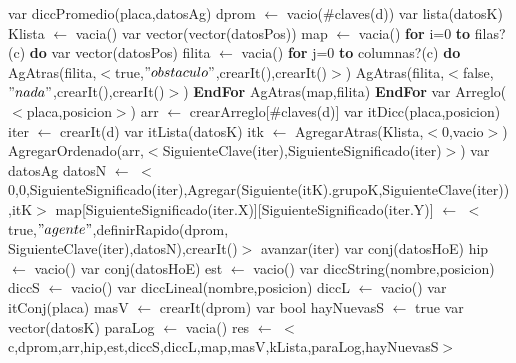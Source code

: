 \begin{algorithm}[H]
\begin{algorithmic}[1]
 
    \State var diccPromedio(placa,datosAg) dprom $\gets$ vacio($\#$claves(d))	
    \State var lista(datosK) Klista $\gets$ vacia()									
    \State var vector(vector(datosPos)) map $\gets$ vacia()						
    \State \textbf{for} i=0 \textbf{to} filas?(c) \textbf{do}					
    	\State var vector(datosPos) filita $\gets$ vacia()						
    	\State \textbf{for} j=0 \textbf{to} columnas?(c) \textbf{do} 			
															
			\State AgAtras(filita,$<$true,$"obstaculo"$,crearIt(),crearIt()$>$)	
		\Else
			\State AgAtras(filita,$<$false,$"nada"$,crearIt(),crearIt()$>$)		
		\EndIf
		\State \textbf{EndFor}										
		\State AgAtras(map,filita)												
	\State \textbf{EndFor}
	\State var Arreglo($<$placa,posicion$>$) arr $\gets$ crearArreglo[$\#$claves(d)]	
	\State var itDicc(placa,posicion) iter $\gets$ crearIt(d)							
    \State var itLista(datosK) itk $\gets$ AgregarAtras(Klista,$<$0,vacio$>$)			
																	
		\State AgregarOrdenado(arr,$<$SiguienteClave(iter),SiguienteSignificado(iter)$>$)	
		\State var datosAg datosN $\gets$ $<$0,0,SiguienteSignificado(iter),Agregar(Siguiente(itK).grupoK,SiguienteClave(iter)),itK$>$
		\State
		\State map[SiguienteSignificado(iter.X)][SiguienteSignificado(iter.Y)] $\gets$ $<$true,$"agente"$,definirRapido(dprom,
		\\\hspace*{3em}SiguienteClave(iter),datosN),crearIt()$>$ 	
		\State
		\State avanzar(iter)	
	\EndWhile
	\State var conj(datosHoE) hip $\gets$ vacio()	
	\State var conj(datosHoE) est $\gets$ vacio()	
	\State var diccString(nombre,posicion) diccS $\gets$ vacio()	
	\State var diccLineal(nombre,posicion) diccL $\gets$ vacio()	
	\State var itConj(placa) masV $\gets$ crearIt(dprom)	
	\State var bool hayNuevasS $\gets$ true	
	\State var vector(datosK) paraLog $\gets$ vacia()	
	\State res $\gets$ $<$c,dprom,arr,hip,est,diccS,diccL,map,masV,kLista,paraLog,hayNuevasS$>$	
\EndFunction
\end{algorithmic}
\end{algorithm}




